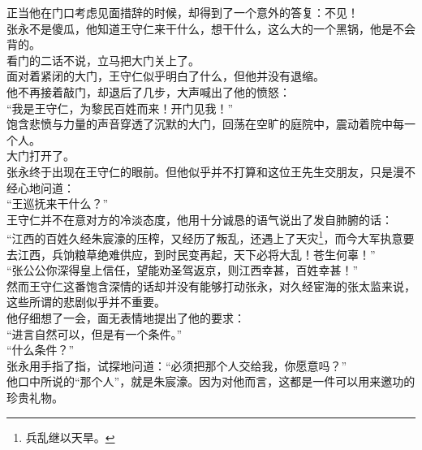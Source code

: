 \begin{multicols}{\theparacolNo}
正当他在门口考虑见面措辞的时候，却得到了一个意外的答复：不见！\\

张永不是傻瓜，他知道王守仁来干什么，想干什么，这么大的一个黑锅，他是不会背的。\\

看门的二话不说，立马把大门关上了。\\

面对着紧闭的大门，王守仁似乎明白了什么，但他并没有退缩。\\

他不再接着敲门，却退后了几步，大声喊出了他的愤怒：\\

“我是王守仁，为黎民百姓而来！开门见我！”\\

饱含悲愤与力量的声音穿透了沉默的大门，回荡在空旷的庭院中，震动着院中每一个人。\\

大门打开了。\\

张永终于出现在王守仁的眼前。但他似乎并不打算和这位王先生交朋友，只是漫不经心地问道：\\

“王巡抚来干什么？”\\

王守仁并不在意对方的冷淡态度，他用十分诚恳的语气说出了发自肺腑的话：\\

“江西的百姓久经朱宸濠的压榨，又经历了叛乱，还遇上了天灾\footnote{兵乱继以天旱。}，而今大军执意要去江西，兵饷粮草绝难供应，到时民变再起，天下必将大乱！苍生何辜！”\\

“张公公你深得皇上信任，望能劝圣驾返京，则江西幸甚，百姓幸甚！”\\

然而王守仁这番饱含深情的话却并没有能够打动张永，对久经宦海的张太监来说，这些所谓的悲剧似乎并不重要。\\

他仔细想了一会，面无表情地提出了他的要求：\\

“进言自然可以，但是有一个条件。”\\

“什么条件？”\\

张永用手指了指，试探地问道：“必须把那个人交给我，你愿意吗？”\\

他口中所说的“那个人”，就是朱宸濠。因为对他而言，这都是一件可以用来邀功的珍贵礼物。\\


\end{multicols}
